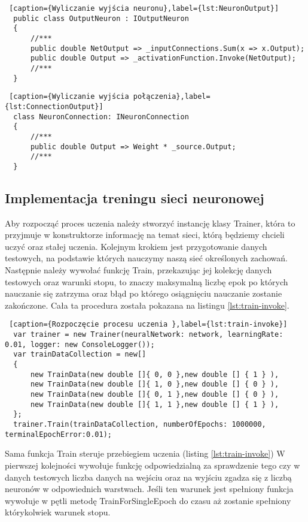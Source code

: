 \begin{lstlisting} [caption={Wyliczanie wyjścia neuronu},label={lst:NeuronOutput}]
  public class OutputNeuron : IOutputNeuron
  {
      //***
      public double NetOutput => _inputConnections.Sum(x => x.Output);
      public double Output => _activationFunction.Invoke(NetOutput);
      //***
  }
\end{lstlisting}


\begin{lstlisting} [caption={Wyliczanie wyjścia połączenia},label={lst:ConnectionOutput}]
  class NeuronConnection: INeuronConnection
  {
      //***
      public double Output => Weight * _source.Output;
      //***
  }
\end{lstlisting}

\subsection{Implementacja treningu sieci neuronowej}

Aby rozpocząć proces uczenia należy stworzyć instancję klasy Trainer, która to przyjmuje w konstruktorze
informację na temat sieci, którą będziemy chcieli uczyć oraz stałej uczenia. 
Kolejnym krokiem jest przygotowanie danych testowych, na podstawie których nauczymy naszą sieć określonych zachowań.
Następnie należy wywołać funkcję Train, przekazując jej kolekcję danych testowych oraz warunki stopu,
to znaczy maksymalną liczbę epok po których nauczanie się zatrzyma oraz błąd po którego osiągnięciu nauczanie zostanie zakończone.
Cała ta procedura została pokazana na listingu \ref{lst:train-invoke}.


\begin{lstlisting} [caption={Rozpoczęcie procesu uczenia },label={lst:train-invoke}]
  var trainer = new Trainer(neuralNetwork: network, learningRate: 0.01, logger: new ConsoleLogger());
  var trainDataCollection = new[]
  {
      new TrainData(new double []{ 0, 0 },new double [] { 1 } ),
      new TrainData(new double []{ 1, 0 },new double [] { 0 } ),
      new TrainData(new double []{ 0, 1 },new double [] { 0 } ),
      new TrainData(new double []{ 1, 1 },new double [] { 1 } ),
  };
  trainer.Train(trainDataCollection, numberOfEpochs: 1000000, terminalEpochError:0.01);
\end{lstlisting}

Sama funkcja Train steruje przebiegiem uczenia (listing \ref{lst:train-invoke})
W pierwszej kolejności wywołuje funkcję odpowiedzialną za sprawdzenie tego czy w danych testowych liczba danych na wejściu oraz na wyjściu zgadza się z liczbą neuronów w odpowiednich warstwach.
Jeśli ten warunek jest spełniony funkcja wywołuje w pętli metodę TrainForSingleEpoch do czasu aż zostanie spełniony którykolwiek warunek stopu.


